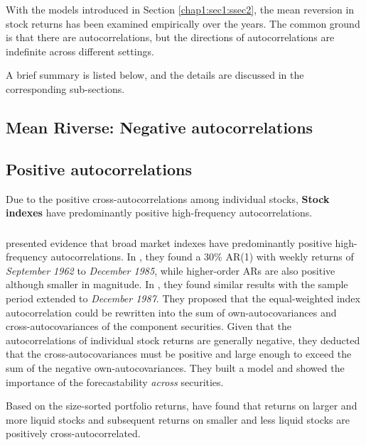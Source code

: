With the models introduced in Section \ref{chap1:sec1:ssec2}, the mean reversion in stock returns
has been examined empirically over the years. The common ground is that there are autocorrelations,
but the directions of autocorrelations are indefinite across different settings.

A brief summary is listed below, and the details are discussed in the corresponding sub-sections.

\subsection{Mean Riverse: Negative autocorrelations}\label{chap1:sec2:ssec1}

\subsection{Positive autocorrelations}\label{chap1:sec2:ssec2}
Due to the positive cross-autocorrelations among individual stocks, \textbf{Stock indexes} have predominantly
positive high-frequency autocorrelations.

\subsubsection{\citet{lo1988stock,lo1990contrarian}}
\citet{lo1988stock,lo1990contrarian} presented evidence that broad market indexes have predominantly positive
high-frequency autocorrelations. In \citeyear{lo1988stock}, they found a 30\% AR(1) with weekly returns
of \textit{September 1962} to \textit{December 1985}, while higher-order ARs are also positive although smaller in magnitude.
In \citeyear{lo1990contrarian}, they found similar results with the sample period extended to \textit{December 1987}.
They proposed that the equal-weighted index autocorrelation could be rewritten into the sum of own-autocovariances
and cross-autocovariances of the component securities. Given that the autocorrelations of individual stock returns
are generally negative, they deducted that the cross-autocovariances must be positive and large enough to exceed the sum
of the negative own-autocovariances. They built a model and showed the importance of the
 forecastability \textit{across} securities. 

Based on the size-sorted portfolio returns, \citeauthor{lo1990contrarian} have found that returns on larger and more liquid stocks 
and subsequent returns on smaller and less liquid stocks are positively cross-autocorrelated. 



